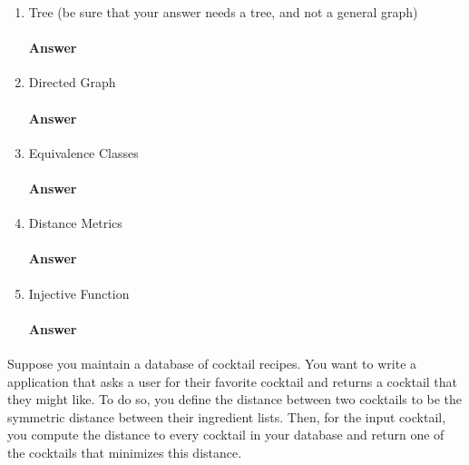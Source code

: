 \documentclass{article}
\begin{document}
\begin{enumerate}

    \item Tree (be sure that your answer needs a tree, and not a general graph)

        \paragraph{Answer}


    \item Directed Graph

        \paragraph{Answer}


    \item Equivalence Classes

        \paragraph{Answer}


    \item Distance Metrics

        \paragraph{Answer}


    \item Injective Function

        \paragraph{Answer}



\end{enumerate}


\collab{\todo{}} 

Suppose you maintain a database of cocktail recipes.  You want to write a
application that asks a user for their favorite cocktail and returns a cocktail
that they might like.  To do so, you define the distance between two cocktails
to be the symmetric distance between their ingredient lists.  Then, for the
input cocktail, you compute the distance to every cocktail in your database and
return one of the cocktails that minimizes this distance.
\end{document}
